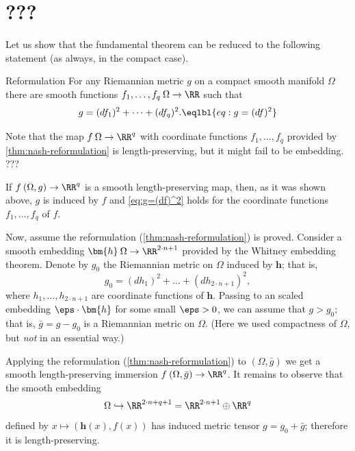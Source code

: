 \section{???}

Let us show that the fundamental theorem can be reduced to the following statement (as always, in the compact case).

\begin{thm}{Reformulation}\label{thm:nash-reformulation}
For any Riemannian metric $g$ on a compact smooth manifold $\Omega $ there are smooth functions $f_1,\dots,f_q\:\Omega \to\RR$ such that 
\[g=(df_1)^2+\dots+(df_q)^2.\eqlbl{eq:g=(df)^2}\]
\end{thm}

Note that the map $f\:\Omega \to\RR^q$ with coordinate functions $f_1,\dots,f_q$ provided by \ref{thm:nash-reformulation} is length-preserving, but it might fail to be embedding.
???

If $f\:(\Omega ,g)\to \RR^q$ is a smooth length-preserving map, then, as it was shown above, $g$ is induced by $f$ and \ref{eq:g=(df)^2} holds for the coordinate functions $f_1,\dots, f_q$ of $f$.

Now, assume the reformulation (\ref{thm:nash-reformulation}) is proved.
Consider a smooth embedding $\bm{h}\:\Omega \to \RR^{2\cdot n+1}$ provided by the Whitney embedding theorem.
Denote by $g_0$ the Riemannian metric on $\Omega $ induced by $\bm{h}$;
that is,  
\[g_0=(dh_1)^2+\dots+(dh_{2\cdot n+1})^2,\]
where $h_1,\dots,h_{2\cdot n+1}$ are coordinate functions of $\bm{h}$.
Passing to an scaled embedding $\eps\cdot \bm{h}$ for some small $\eps>0$, we can assume that $g>g_0$; that is, $\bar g=g-g_0$ is a Riemannian metric on $\Omega $.
(Here we used compactness of $\Omega$, but \emph{not} in an essential way.)

Applying the reformulation (\ref{thm:nash-reformulation}) to $(\Omega ,\bar g)$ we get a smooth length-preserving immersion $f\:(\Omega ,\bar g)\to\RR^q$.
It remains to observe that the smooth embedding
\[\Omega \hookrightarrow \RR^{2\cdot n+q+1}=\RR^{2\cdot n+1}\oplus\RR^q\] defined by
$x\mapsto (\bm{h}(x),f(x))$ has induced metric tensor $g=g_0+\bar g$;
therefore it is length-preserving.
\qeds


















